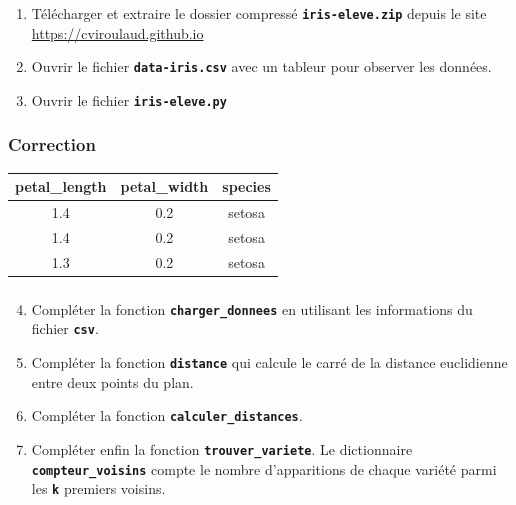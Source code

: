 \documentclass[svgnames,11pt]{beamer}
\begin{document}
\begin{frame}
    \frametitle{}

    \begin{activite}
        \begin{enumerate}
            \item Télécharger et extraire le dossier compressé \texttt{\textbf{iris-eleve.zip}} depuis le site \url{https://cviroulaud.github.io}
            \item Ouvrir le fichier \texttt{\textbf{data-iris.csv}} avec un tableur pour observer les données.
            \item Ouvrir le fichier \texttt{\textbf{iris-eleve.py}}


        \end{enumerate}
    \end{activite}

\end{frame}
\begin{frame}
    \frametitle{Correction}

    \begin{center}
        \begin{tabular}[]{|*{3}{c|}}
            \hline
            petal\_length & petal\_width & species \\
            \hline
            1.4           & 0.2          & setosa  \\
            \hline
            1.4           & 0.2          & setosa  \\
            \hline
            1.3           & 0.2          & setosa  \\
            \hline
        \end{tabular}
    \end{center}
\end{frame}
\begin{frame}
    \frametitle{}
    \setcounter{compteuractivite}{2}

    \begin{activite}

        \begin{enumerate}
            \setcounter{enumi}{3}

            \item Compléter la fonction \texttt{\textbf{charger\_donnees}} en utilisant les informations du fichier \texttt{\textbf{csv}}.
            \item Compléter la fonction \texttt{\textbf{distance}} qui calcule le carré de la distance euclidienne entre deux points du plan.
            \item Compléter la fonction \texttt{\textbf{calculer\_distances}}.
            \item Compléter enfin la fonction \texttt{\textbf{trouver\_variete}}. Le dictionnaire \texttt{\textbf{compteur\_voisins}} compte le nombre d'apparitions de chaque variété parmi les \texttt{\textbf{k}} premiers voisins.
        \end{enumerate}
    \end{activite}

\end{frame}
\end{document}
